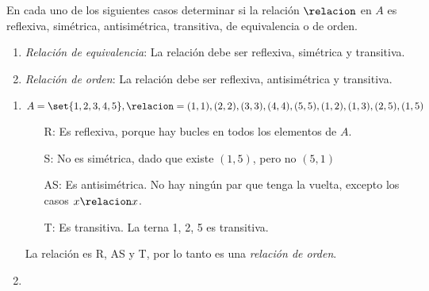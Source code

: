 \ejercicio En cada uno de los siguientes casos determinar si la relación $\relacion $ en $A$ es reflexiva, simétrica,
antisimétrica, transitiva, de equivalencia o de orden.

\begin{enumerate}
	\item \textit{Relación de equivalencia}: La relación debe ser reflexiva, simétrica y transitiva.
	\item \textit{Relación de orden}: La relación debe ser reflexiva, antisimétrica y transitiva.
\end{enumerate}

\begin{enumerate}[label=\roman*)]
	\item  $A = \set{1,2,3,4,5}, \relacion = {(1,1), (2,2), (3,3), (4,4), (5,5), (1,2), (1,3), (2,5), (1,5)}$\\
	      \begin{enumerate}
		      \item[R:] Es reflexiva, porque hay bucles en todos los elementos de $A$.
		      \item[S:] No es simétrica, dado que existe $(1, 5)$, pero no $(5, 1)$
		      \item[AS:] Es antisimétrica. No hay ningún par que tenga la vuelta, excepto los casos $x \relacion x$.
		      \item[T:] Es transitiva. La terna 1, 2, 5 es transitiva.
	      \end{enumerate}
	      La relación es R, AS y T, por lo tanto es una \textit{relación de orden}.

	\item \hacer


\end{enumerate}
